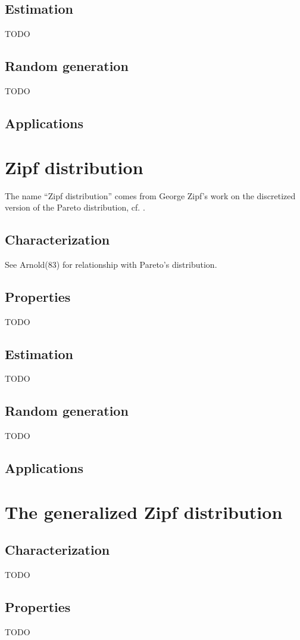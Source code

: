 \subsection{Estimation}
TODO
\subsection{Random generation}
TODO
\subsection{Applications}



\section{Zipf distribution}
The name ``Zipf distribution'' comes from George Zipf's work on the discretized version of the Pareto distribution, cf. \cite{arnold83}.
\subsection{Characterization}
See Arnold(83) for relationship with Pareto's distribution.
\subsection{Properties}
TODO
\subsection{Estimation}
TODO
\subsection{Random generation}
TODO
\subsection{Applications}

\section{The generalized Zipf distribution}
\subsection{Characterization}
TODO
\subsection{Properties}
TODO
